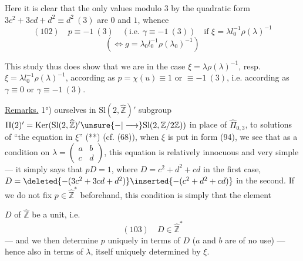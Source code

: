 
Here it is clear that the only values modulo $3$  by the quadratic form $3c^2+3cd+d^2\equiv d^2\ (3)$ are $0$ and $1$, whence
\[
(102)\quad p\equiv-1\ (3)\quad(\text{i.e. }\gamma\equiv-1\ (3))\quad\text{if }\xi=\lambda l_0^{-1}\rho(\lambda)^{-1}
\]
\[
(\Longleftrightarrow g=\lambda_0l_0^{-1}\rho(\lambda_0)^{-1})
\]

This study thus does show that we are in the case $\xi=\lambda\rho(\lambda)^{-1}$, resp. $\xi=\lambda l_0^{-1}\rho(\lambda)^{-1}$, according as $p=\chi(u)\equiv1$ or $\equiv-1\ (3)$, i.e. according as $\gamma\equiv0$ or $\gamma\equiv-1\ (3)$.

\uline{Remarks.} 1°)  ourselves in $\mathrm{Sl}(2,\widehat{\mathbb Z})'$    subgroup $\Pi(2)'=\operatorname{Ker}(\mathrm{Sl}(2,\widehat{\mathbb Z})'\unsure{-|\longrightarrow}\mathrm{Sl}(2,\mathbb Z/2\mathbb Z))$ in place of $\widehat{\Pi}_{0,3}$, to   solutions of ``the equation in $\xi$'' (**) (cf. (68)), when $\xi$ is put in  form (94), we see that as a condition on $\lambda=\begin{pmatrix}a&b\\c&d\end{pmatrix}$, this equation is relatively innocuous and very simple --- it simply says that $pD=1$, where $D=c^2+d^2+cd$ in the first case, $D=\deleted{-(3c^2+3cd+d^2)}\inserted{-(c^2+d^2+cd)}$ in the second. If we do not fix $p\in\widehat{\mathbb Z}^{*}$ beforehand, this condition is simply that the element


$D$ of $\widehat{\mathbb Z}$ be a unit, i.e.
\[
(103)\quad D\in\widehat{\mathbb Z}^{*}
\]
--- and we then determine $p$ uniquely in terms of $D$  ($a$ and $b$ are of no use) --- hence also in terms of $\lambda$, itself uniquely determined by $\xi$.

